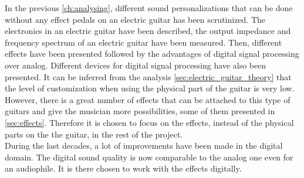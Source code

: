 In the previous \autoref{ch:analysing}, different sound personalizations that can be done without any effect pedals on an electric guitar has been scrutinized. The electronics in an electric guitar have been described, the output impedance and frequency spectrum of an electric guitar have been measured. Then, different effects have been presented followed by the advantages of digital signal processing over analog. Different devices for digital signal processing have also been presented. 
It can be inferred from the analysis \autoref{sec:electric_guitar_theory} that the level of customization when using the physical part of the guitar is very low. However, there is a great number of effects that can be attached to this type of guitars and give the musician more possibilities, some of them presented in \autoref{sec:effects}. Therefore it is chosen to focus on the effects, instead of the physical parts on the the guitar, in the rest of the project.  \\
During the last decades, a lot of improvements have been made in the digital domain. The digital sound quality is now comparable to the analog one even for an audiophile. It is there chosen to work with the effects digitally.

